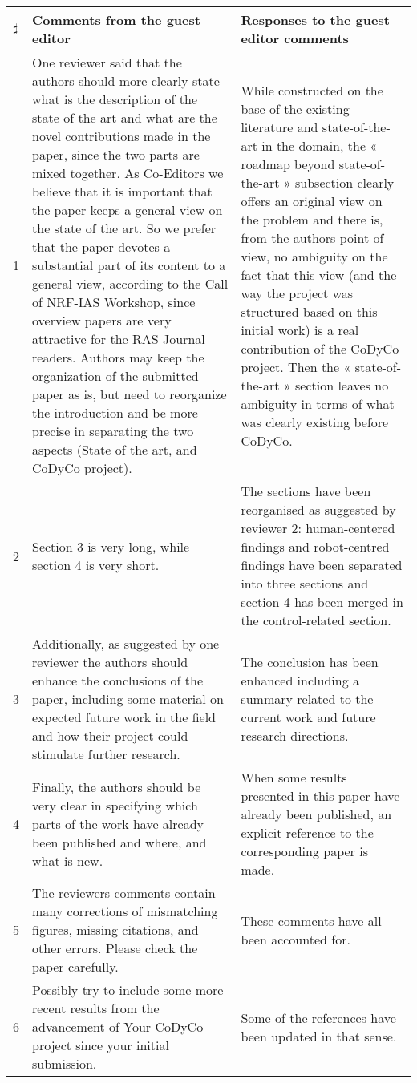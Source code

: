 \documentclass[12pt,a4paper]{article}
\begin{document}
\hspace{-0.5cm}
\begin{tabular}[!h]{|p{0.3cm}|p{8.5cm}||p{9cm}|}
\hline
$\sharp$ & Comments from the guest editor & Responses to the guest editor comments\tabularnewline  \hline \hline
1 & One reviewer said that the authors should more clearly state what
is the description of the state of the art and what are the novel
contributions made in the paper, since the two parts are mixed together.
As Co-Editors we  believe that it is important that the paper keeps
a general view on the state of the art. So we prefer that the paper
devotes a substantial part of its content to a general view, according
to the Call of NRF-IAS Workshop, since overview papers are very attractive
for the RAS Journal readers. Authors may keep the organization of
the submitted paper as is, but need to reorganize the introduction
and be more precise in separating the two aspects (State of the art,
and CoDyCo project). & While constructed on the base of the existing literature and state-of-the-art
 in the domain, the « roadmap beyond state-of-the-art » subsection
clearly offers an original view on the problem and there is, from
the authors point of view, no ambiguity on the fact that this view
(and the way the project was structured based on this initial work)
is a real contribution of the CoDyCo project. Then the « state-of-the-art »
section leaves no ambiguity in terms of what was clearly existing
before CoDyCo.\tabularnewline \hline
2 & Section 3 is very long, while section 4 is very short.  & The sections have been reorganised as suggested by reviewer 2: human-centered
findings and robot-centred findings have been separated into three sections
and section 4 has been merged in the control-related section.\tabularnewline \hline
3 & Additionally, as suggested by one reviewer the authors should enhance
the conclusions of the paper, including some material on expected
future work in the field and how their project could stimulate further
research. & The conclusion has been enhanced including a summary related to the
current work and future research directions.\tabularnewline \hline
4 & Finally, the authors should be very clear in specifying which parts
of the work have already been published and where, and what is new. & When some results presented in this paper have already been published,
an explicit reference to the corresponding paper is made.\tabularnewline \hline
5 & The reviewers comments contain many corrections of mismatching figures,
missing citations, and other errors. Please check the paper carefully. & These comments have all been accounted for.\tabularnewline \hline
6 & Possibly try to include some more recent results from the advancement
of Your CoDyCo project since your initial submission. & Some of the references have been updated in that sense.\tabularnewline \hline
\end{tabular}
\end{document}
